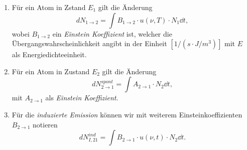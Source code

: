 \documentclass{subfiles}
\begin{document}
                \begin{enumerate}[label=(\roman*)]
                    \item Für ein Atom in Zstand $E_1$ gilt die Änderung 
                    \[
                        dN_{1\to 2} = \int B_{1\to 2}\cdot u(\nu,T)\cdot N_1\dd t,\tag{\star}
                    \]
                    wobei $B_{1\to 2}$ ein \emph{Einstein Koeffizient} ist, welcher die Übergangswahrscheinlichkeit angibt in der Einheit $[1/(s\cdot J/m^3)]$ mit $E$ als Energiedichteeinheit. 
                    \item Für ein Atom in Zustand $E_2$ gilt die Änderung
                    \[
                        dN_{2\to 1}^\textit{spont} = \int A_{2\to 1}\cdot N_2\dd t,\tag{\star}
                    \]
                    mit $A_{2\to 1}$ als \emph{Einstein Koeffizient}. 
                    \item Für die \emph{induzierte Emission} können wir mit weiterem Einsteinkoeffizienten $B_{2\to 1}$ notieren
                    \[
                        dN_{I,21}^\textit{ind} = \int B_{2\to 1}\cdot u(\nu, t)\cdot N_2\dd t.\tag{\star}
                    \]
                \end{enumerate}
\end{document}
